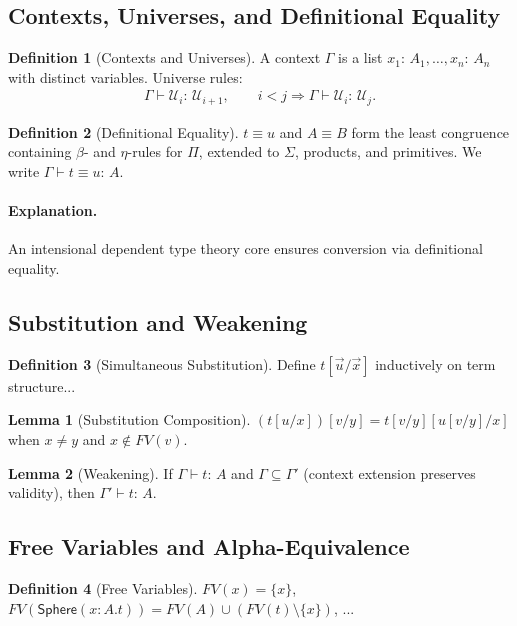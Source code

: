 \documentclass[12pt]{article}
\newcommand{\To}{\Rightarrow}
\newcommand{\Entails}{\vdash}
\newcommand{\Types}{:\,}
\newcommand{\Sphere}{\mathsf{Sphere}}
\newcommand{\Ctx}{\Gamma}
\newcommand{\UU}[1]{\mathcal{U}_{#1}}
\theoremstyle{definition}
\newtheorem{definition}{Definition}
\newtheorem{lemma}{Lemma}
\begin{document}
\subsection{Contexts, Universes, and Definitional Equality}
\begin{definition}[Contexts and Universes]
A context $\Ctx$ is a list $x_1\Types A_1,\dots,x_n\Types A_n$ with
distinct variables. Universe rules:
\begin{align*}
\Ctx \Entails \UU{i} \Types \UU{i+1}, \qquad i < j \To \Ctx \Entails \UU{i} \Types \UU{j}.
\end{align*}
\end{definition}

\begin{definition}[Definitional Equality]
$t \equiv u$ and $A \equiv B$ form the least congruence containing
$\beta$- and $\eta$-rules for $\Pi$, extended to $\Sigma$, products,
and primitives. We write $\Ctx \Entails t \equiv u \Types A$.
\end{definition}

\paragraph{Explanation.} An intensional dependent type theory core ensures conversion via definitional equality.

\subsection{Substitution and Weakening}
\begin{definition}[Simultaneous Substitution]
Define $t[\vec{u}/\vec{x}]$ inductively on term structure...
\end{definition}

\begin{lemma}[Substitution Composition]
$(t[u/x])[v/y] = t[v/y][u[v/y]/x]$ when $x \neq y$ and $x \notin FV(v)$.
\end{lemma}

\begin{lemma}[Weakening]
If $\Ctx \Entails t \Types A$ and $\Ctx \subseteq \Ctx'$ (context extension preserves validity),
then $\Ctx' \Entails t \Types A$.
\end{lemma}

\subsection{Free Variables and Alpha-Equivalence}
\begin{definition}[Free Variables]
$FV(x) = \{x\}$, $FV(\Sphere(x:A.t)) = FV(A) \cup (FV(t) \setminus \{x\})$, ...
\end{definition}
\end{document}
